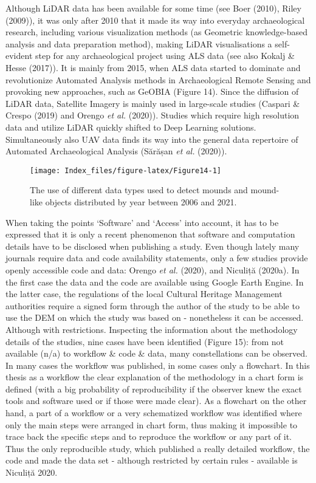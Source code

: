 \documentclass[
  12pt,
]{article}
\begin{document}
Although LiDAR data has been available for some time (see Boer (2010), Riley (2009)), it was only after 2010 that it made its way into everyday archaeological research, including various visualization methods (as Geometric knowledge-based analysis and data preparation method), making LiDAR visualisations a self-evident step for any archaeological project using ALS data (see also Kokalj \& Hesse (2017)). It is mainly from 2015, when ALS data started to dominate and revolutionize Automated Analysis methods in Archaeological Remote Sensing and provoking new approaches, such as GeOBIA (Figure 14). Since the diffusion of LiDAR data, Satellite Imagery is mainly used in large-scale studies (Caspari \& Crespo (2019) and Orengo \emph{et al.} (2020)). Studies which require high resolution data and utilize LiDAR quickly shifted to Deep Learning solutions. Simultaneously also UAV data finds its way into the general data repertoire of Automated Archaeological Analysis (Sărășan \emph{et al.} (2020)).

\begin{figure}

{\centering \texttt{[image: Index\_files/figure-latex/Figure14-1]} 

}

\caption{The use of different data types used to detect mounds and mound-like objects distributed by year between 2006 and 2021.}\label{fig:Figure14}
\end{figure}

When taking the points `Software' and `Access' into account, it has to be expressed that it is only a recent phenomenon that software and computation details have to be disclosed when publishing a study. Even though lately many journals require data and code availability statements, only a few studies provide openly accessible code and data: Orengo \emph{et al.} (2020), and Niculiță (2020a). In the first case the data and the code are available using Google Earth Engine. In the latter case, the regulations of the local Cultural Heritage Management authorities require a signed form through the author of the study to be able to use the DEM on which the study was based on - nonetheless it can be accessed. Although with restrictions.
Inspecting the information about the methodology details of the studies, nine cases have been identified (Figure 15): from not available (n/a) to workflow \& code \& data, many constellations can be observed. In many cases the workflow was published, in some cases only a flowchart. In this thesis as a workflow the clear explanation of the methodology in a chart form is defined (with a big probability of reproducibility if the observer knew the exact tools and software used or if those were made clear). As a flowchart on the other hand, a part of a workflow or a very schematized workflow was identified where only the main steps were arranged in chart form, thus making it impossible to trace back the specific steps and to reproduce the workflow or any part of it. Thus the only reproducible study, which published a really detailed workflow, the code and made the data set - although restricted by certain rules - available is Niculiță 2020.
\end{document}
